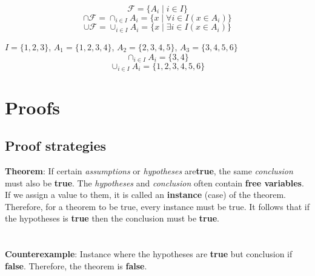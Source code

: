 \documentclass[../setup.tex]{subfiles}
\begin{document}
\begin{theorem}
	\[\mathcal{F} = \{A_i \mid i \in I\}\]
	\[\cap\mathcal{F} = \cap_{i \in I}A_i = \{x \mid \forall i \in I(x \in A_i)\}\]
	\[\cup\mathcal{F} = \cup_{i \in I}A_i = \{x \mid \exists i \in I(x \in A_i)\}\]
\end{theorem}

\begin{example}
	$I = \{1, 2, 3\}$, $A_1 = \{1, 2, 3, 4\}$, $A_2 = \{2, 3, 4, 5\}$, $A_3 = \{3, 4, 5, 6\}$
	\[\cap_{i \in I}A_i = \{3, 4\}\]
	\[\cup_{i \in I}A_i = \{1, 2, 3, 4, 5, 6\}\]
\end{example}


\section{Proofs}
\subsection{Proof strategies}
\textbf{Theorem}: If certain \textit{assumptions} or \textit{hypotheses} are\textbf{true}, the same \textit{conclusion} must also be \textbf{true}. The \textit{hypotheses} and \textit{conclusion} often contain \textbf{free variables}. If we assign a value to them, it is called an \textbf{instance} (case) of the theorem. Therefore, for a theorem to be true, every instance must be true. It follows that if the hypotheses is \textbf{true} then the conclusion must be \textbf{true}. \\
\phantom \\ \\
\textbf{Counterexample}: Instance  where the hypotheses are \textbf{true} but conclusion if \textbf{false}. Therefore, the theorem is \textbf{false}.
\end{document}

